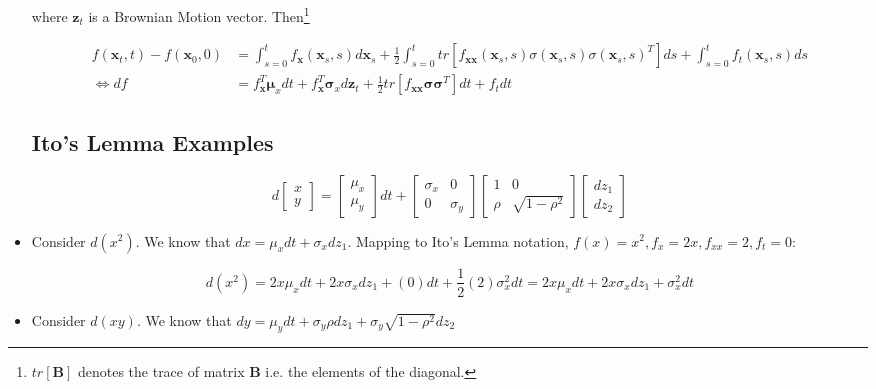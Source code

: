 \documentclass{article}
\newcommand{\xvec}{\mathbf{x}}
\newcommand{\zvec}{\mathbf{z}}
\newcommand{\muvec}{\boldsymbol{\mu}}
\newcommand{\sigmamat}{\boldsymbol{\sigma}}
\begin{document}
\begin{itemize}
where $\zvec_t$ is a Brownian Motion vector. Then\footnote{$tr[\mathbf{B}]$ denotes the trace of matrix $\mathbf{B}$ i.e. the elements of the diagonal.}

\begin{align*}
f(\xvec_t, t) - f(\xvec_0, 0) &= \int_{s=0}^t f_\xvec(\xvec_s, s) d\xvec_s + \frac{1}{2} \int_{s=0}^t tr[f_{\xvec\xvec} (\xvec_s, s) \sigma(\xvec_s, s)\sigma(\xvec_s, s)^T] ds + \int_{s=0}^t f_t(\xvec_s, s) ds\\
\iff
df &= f_\xvec^T \muvec_x dt + f_\xvec^T \sigmamat_x d\zvec_t + \frac{1}{2} tr[f_{\xvec\xvec} \sigmamat\sigmamat^T] dt + f_t dt
\end{align*}

\subsection*{Ito's Lemma Examples}

$$
d \begin{bmatrix} x \\ y \end{bmatrix} = \begin{bmatrix} \mu_x \\ \mu_y \end{bmatrix} dt + \begin{bmatrix} \sigma_x & 0 \\ 0 & \sigma_y \end{bmatrix} \begin{bmatrix} 1 & 0 \\ \rho & \sqrt{1 - \rho^2} \end{bmatrix} \begin{bmatrix} dz_1 \\ dz_2 \end{bmatrix}
$$

\item Consider $d(x^2)$.  We know that $dx = \mu_x dt + \sigma_x dz_1$. Mapping to Ito's Lemma notation, $f(x) = x^2, f_x = 2x, f_{xx} = 2, f_t = 0$:

$$
d(x^2) = 2x \mu_x dt + 2x \sigma_x dz_1 + (0) dt + \frac{1}{2} (2)\sigma_x^2 dt = 2x \mu_x dt + 2x \sigma_x dz_1 + \sigma_x^2dt 
$$

\item Consider $d(xy)$. We know that $dy = \mu_y dt + \sigma_y \rho dz_1 + \sigma_y \sqrt{1 - \rho^2} dz_2$


\end{itemize}
\end{document}

